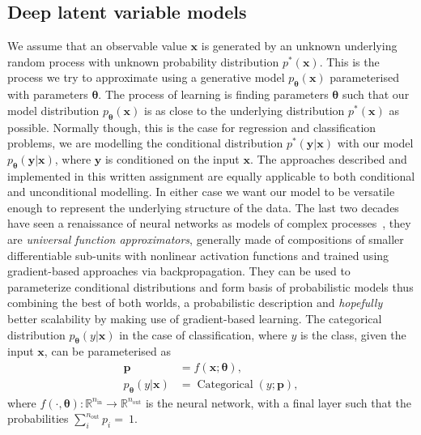 \subsection{Deep latent variable models}
We assume that an observable value $\mathbf{x}$ is generated by an unknown underlying random process with unknown probability distribution $p^*(\mathbf{x})$. This is the process we try to approximate using a generative model $p_{\boldsymbol{\theta}}(\mathbf{x})$ parameterised with parameters $\boldsymbol{\theta}$. The process of learning is finding parameters $\boldsymbol{\theta}$ such that our model distribution $p_{\boldsymbol{\theta}}(\mathbf{x})$ is as close to the underlying distribution $p^*(\mathbf{x})$ as possible. Normally though, this is the case for regression and classification problems, we are modelling the conditional distribution $p^{*}(\mathbf{y} | \mathbf{x})$ with our model $p_{\boldsymbol{\theta}}(\mathbf{y} | \mathbf{x})$, where $\mathbf{y}$ is conditioned on the input $\mathbf{x}$. The approaches described and implemented in this written assignment are equally applicable to both conditional and unconditional modelling. In either case we want our model to be versatile enough to represent the underlying structure of the data. The last two decades have seen a renaissance of neural networks as models of complex processes~\cite{goodfellow2016deep}, they are \emph{universal function approximators}, generally made of compositions of smaller differentiable sub-units with nonlinear activation functions and trained using gradient-based approaches via backpropagation. They can be used to parameterize conditional distributions and form basis of probabilistic models thus combining the best of both worlds, a probabilistic description and \emph{hopefully} better scalability by making use of gradient-based learning. The categorical distribution $p_{\boldsymbol{\theta}}(y|\mathbf{x})$ in the case of classification, where $y$ is the class, given the input $\mathbf{x}$, can be parameterised as
\begin{equation}
	\begin{aligned}
		\mathbf{p} &= f(\mathbf{x}; \boldsymbol{\theta}), \\
		p_{\boldsymbol{\theta}}(y | \mathbf{x})&=\operatorname{Categorical}(y ; \mathbf{p}),
	\end{aligned}
\end{equation}
where $f(\cdot, \boldsymbol{\theta}): \mathbb{R}^{n_{\mathrm{in}}} \rightarrow \mathbb{R}^{n_{\mathrm{out}}}$ is the neural network, with a final layer such that the probabilities $\sum_{i}^{n_\mathrm{out}} p_{i}=~1$. 

